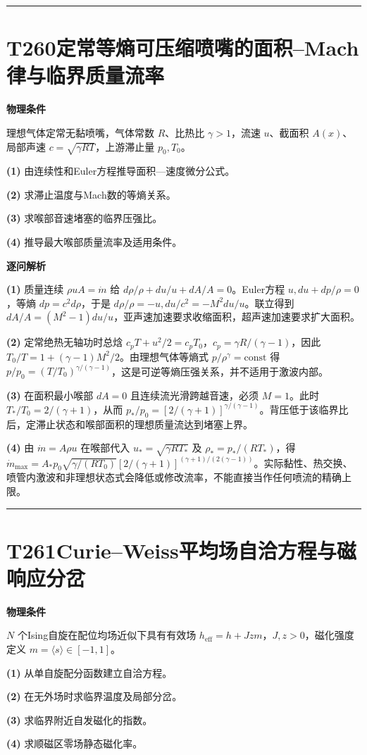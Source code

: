 \documentclass[UTF8,a4paper,11pt,oneside,openany]{ctexbook}
\begin{document}
\par\bigskip\hrule\bigskip
\section*{T260\quad 定常等熵可压缩喷嘴的面积–Mach律与临界质量流率}
\textbf{物理条件}\par 理想气体定常无黏喷嘴，气体常数 \(R\)、比热比 \(\gamma>1\)，流速 \(u\)、截面积 \(A(x)\)、局部声速 \(c=\sqrt{\gamma RT}\)，上游滞止量 \(p_0,T_0\)。
\par\noindent\textbf{(1)} 由连续性和Euler方程推导面积—速度微分公式。
\par\noindent\textbf{(2)} 求滞止温度与Mach数的等熵关系。
\par\noindent\textbf{(3)} 求喉部音速堵塞的临界压强比。
\par\noindent\textbf{(4)} 推导最大喉部质量流率及适用条件。

\par\medskip\noindent\textbf{逐问解析}
\par\noindent\textbf{(1)} 质量连续 \(\rho uA=\dot m\) 给 \(d\rho/\rho+du/u+dA/A=0\)。Euler方程 \(u,du+dp/\rho=0\)，等熵 \(dp=c^2d\rho\)，于是 \(d\rho/\rho=-u,du/c^2=-M^2du/u\)。联立得到 \(dA/A=(M^2-1)du/u\)，亚声速加速要求收缩面积，超声速加速要求扩大面积。
\par\noindent\textbf{(2)} 定常绝热无轴功时总焓 \(c_pT+u^2/2=c_pT_0\)，\(c_p=\gamma R/(\gamma-1)\)，因此 \(T_0/T=1+(\gamma-1)M^2/2\)。由理想气体等熵式 \(p/\rho^\gamma=\mathrm{const}\) 得 \(p/p_0=(T/T_0)^{\gamma/(\gamma-1)}\)，这是可逆等熵压强关系，并不适用于激波内部。
\par\noindent\textbf{(3)} 在面积最小喉部 \(dA=0\) 且连续流光滑跨越音速，必须 \(M=1\)。此时 \(T_*/T_0=2/(\gamma+1)\)，从而 \(p_*/p_0=[2/(\gamma+1)]^{\gamma/(\gamma-1)}\)。背压低于该临界比后，定滞止状态和喉部面积的理想质量流达到堵塞上界。
\par\noindent\textbf{(4)} 由 \(\dot m=A\rho u\) 在喉部代入 \(u_*=\sqrt{\gamma RT_*}\) 及 \(\rho_*=p_*/(RT_*)\)，得 \(\dot m_{\max}=A_*p_0\sqrt{\gamma/(RT_0)}[2/(\gamma+1)]^{(\gamma+1)/(2(\gamma-1))}\)。实际黏性、热交换、喷管内激波和非理想状态式会降低或修改流率，不能直接当作任何喷流的精确上限。

\par\bigskip\hrule\bigskip
\section*{T261\quad Curie–Weiss平均场自洽方程与磁响应分岔}
\textbf{物理条件}\par \(N\) 个Ising自旋在配位均场近似下具有有效场 \(h_{\mathrm{eff}}=h+Jzm\)，\(J,z>0\)，磁化强度定义 \(m=\langle s\rangle\in[-1,1]\)。
\par\noindent\textbf{(1)} 从单自旋配分函数建立自洽方程。
\par\noindent\textbf{(2)} 在无外场时求临界温度及局部分岔。
\par\noindent\textbf{(3)} 求临界附近自发磁化的指数。
\par\noindent\textbf{(4)} 求顺磁区零场静态磁化率。
\end{document}
